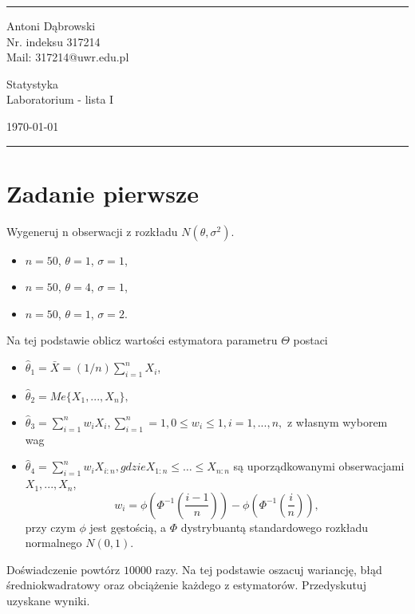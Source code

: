 \documentclass[a4paper]{article}
\begin{document}

\fancyhead[C]{}
\hrule \medskip %
\begin{minipage}{0.295\textwidth} 
\raggedright
\footnotesize
Antoni Dąbrowski \hfill\\   
Nr. indeksu 317214\hfill\\
Mail: 317214@uwr.edu.pl
\end{minipage}
\begin{minipage}{0.4\textwidth} 
\centering 
\large 
Statystyka\\ 
\normalsize 
Laboratorium - lista I\\ 
\end{minipage}
\begin{minipage}{0.295\textwidth} 
\raggedleft
\today\hfill\\
\end{minipage}
\medskip\hrule 
\bigskip



\section{Zadanie pierwsze}
Wygeneruj n obserwacji z rozkładu $N(\theta,\sigma^2)$.
\begin{itemize}
	\item $n=50$, $\theta=1$, $\sigma=1$,
	\item $n=50$, $\theta=4$, $\sigma=1$,
	\item $n=50$, $\theta=1$, $\sigma=2$.
\end{itemize}
Na tej podstawie oblicz wartości estymatora parametru $\Theta$ postaci
\begin{itemize}
\item $\hat{\theta}_1 = \bar{X} = (1/n)\sum_{i=1}^nX_i$,
\item $\hat{\theta}_2 = Me\{X_1,...,X_n\},$
\item $\hat{\theta}_3 = \sum_{i=1}^nw_iX_i,\sum_{i=1}^n=1,0\leq w_i\leq 1,i=1,...,n,$ z własnym wyborem wag
\item $\hat{\theta}_4 = \sum_{i=1}^nw_iX_{i:n}, gdzie X_{1:n}\leq\hdots\leq X_{n:n}$ są uporządkowanymi obserwacjami $X_1,...,X_n$,$$w_i=\phi(\Phi^{-1}(\frac{i-1}{n}))-\phi(\Phi^{-1}(\frac{i}{n})),$$ przy czym $\phi$ jest gęstością, a $\Phi$ dystrybuantą standardowego rozkładu normalnego $N(0,1)$.
\end{itemize}
Doświadczenie powtórz $10 000$ razy. Na tej podstawie oszacuj wariancję, błąd średniokwadratowy oraz obciążenie każdego z estymatorów. Przedyskutuj uzyskane wyniki.
\end{document}
